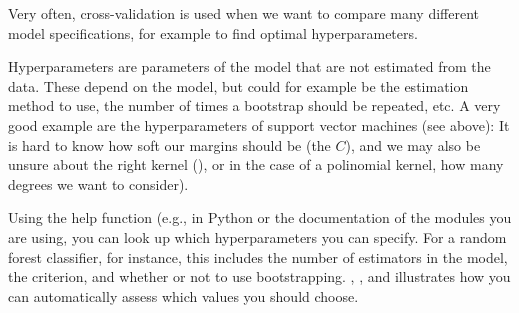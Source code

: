 
Very often, cross-validation is used when we want to compare many
different model specifications, for example to find optimal
hyperparameters.

Hyperparameters are parameters of the model that are not estimated
from the data. These depend on the model, but could for example be the
estimation method to use, the number of times a bootstrap should be
repeated, etc. A very good example are the hyperparameters of support
vector machines (see above): It is hard to know how soft our margins
should be (the $C$), and we may also be unsure about the right kernel
(), or in the case of a polinomial kernel, how many
degrees we want to consider).

Using the help function (e.g.,  in Python
or the documentation of the modules you are using, you can look up
which hyperparameters you can specify. For a random forest classifier,
for instance, this includes the number of estimators in the model, the
criterion, and whether or not to use
bootstrapping. , , and
 illustrates how you can automatically assess which
values you should choose.




\pyrex[input=r,output=r,caption=A gridsearch in R}]{chapter09/gridsearch3}

